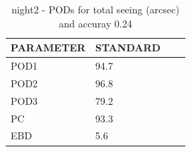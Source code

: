 \begin{table}[p!]
\begin{center}
\begin{tabular}{|l|l|l|l|}
\hline
\multicolumn{1}{|c|}{\cellcolor[HTML]{C0C0C0}\textbf{PARAMETER}} & \multicolumn{1}{c|}{\cellcolor[HTML]{C0C0C0}\textbf{STANDARD}}\\
\hline
\cellcolor[HTML]{C0C0C0}POD1  & 94.7                                \\
\cellcolor[HTML]{C0C0C0}POD2  & 96.8                                \\
\cellcolor[HTML]{C0C0C0}POD3  & 79.2                                \\
\cellcolor[HTML]{C0C0C0}PC    & 93.3                                  \\
\cellcolor[HTML]{C0C0C0}EBD   & 5.6                                 \\
\hline
\end{tabular}
\caption{night2 - PODs for total seeing (arcsec) and accuray 0.24}
\label{tab:podsee0.24:night2}
\end{center}
\end{table}
